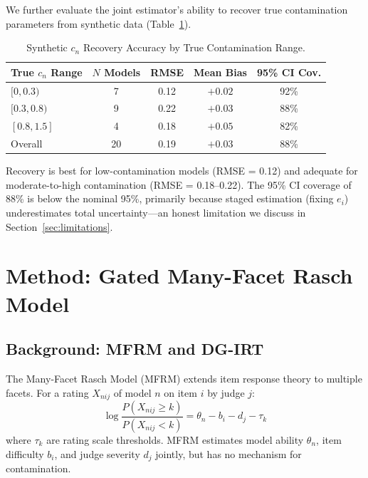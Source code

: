 \documentclass[11pt]{article}
\newcommand{\cn}{c_n}
\newcommand{\ei}{e_i}
\newcommand{\severity}{d_j}
\begin{document}
We further evaluate the joint estimator's ability to recover true contamination parameters from synthetic data (Table~\ref{tab:cn_recovery}).

\begin{table}[t]
\centering
\caption{Synthetic $\cn$ Recovery Accuracy by True Contamination Range.}
\label{tab:cn_recovery}
\begin{tabular}{lcccc}
\toprule
True $\cn$ Range & $N$ Models & RMSE & Mean Bias & 95\% CI Cov. \\
\midrule
$[0, 0.3)$ & 7 & 0.12 & $+0.02$ & 92\% \\
$[0.3, 0.8)$ & 9 & 0.22 & $+0.03$ & 88\% \\
$[0.8, 1.5]$ & 4 & 0.18 & $+0.05$ & 82\% \\
\midrule
Overall & 20 & 0.19 & $+0.03$ & 88\% \\
\bottomrule
\end{tabular}
\end{table}

Recovery is best for low-contamination models (RMSE = 0.12) and adequate for moderate-to-high contamination (RMSE = 0.18--0.22).
The 95\% CI coverage of 88\% is below the nominal 95\%, primarily because staged estimation (fixing $\ei$) underestimates total uncertainty---an honest limitation we discuss in Section~\ref{sec:limitations}.

\section{Method: Gated Many-Facet Rasch Model}
\label{sec:method}

\subsection{Background: MFRM and DG-IRT}

The Many-Facet Rasch Model (MFRM) extends item response theory to multiple facets.
For a rating $X_{nij}$ of model $n$ on item $i$ by judge $j$:
\begin{equation}
    \log\frac{P(X_{nij} \geq k)}{P(X_{nij} < k)} = \theta_n - b_i - \severity - \tau_k
\end{equation}
where $\tau_k$ are rating scale thresholds.
MFRM estimates model ability $\theta_n$, item difficulty $b_i$, and judge severity $\severity$ jointly, but has no mechanism for contamination.
\end{document}
